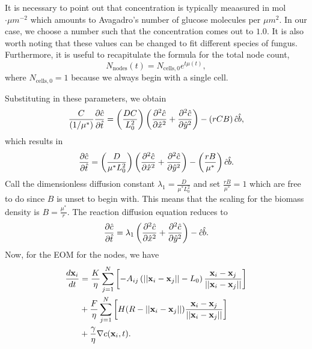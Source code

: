 It is necessary to point out that concentration is typically meaasured in
mol$\cdot \mu m^{-2}$ which amounts to Avagadro's number of glucose molecules
per $\mu m^{2}$. In our case, we choose a number such that the concentration
comes out to $1.0$. It is also worth noting that these values
can be changed to fit different species of fungus.
\\

Furthermore, it is useful to recapitulate the formula for the total node count,
\begin{equation*}  
    N_{\textrm{nodes}}(t) = N_{\textrm{cells},0} e^{ t \mu(t)},
\end{equation*}
where $N_{\textrm{cells},0} = 1$ because we always begin with a single cell.

Substituting in these parameters, we obtain 
\begin{equation*}
    \frac{C}{(1/\mu^*)}\pdv{\hat{c}}{\hat{t}} = \left(\frac{D C}{ L_0^2} \right)\left(\pdv[2]{\hat{c}}{\hat{x}} + \pdv[2]{\hat{c}}{\hat{y}} \right) -
      \left( r C B\right)  \hat{c}\hat{b},
\end{equation*}
which results in 
\begin{equation*}
    \pdv{\hat{c}}{\hat{t}} = \left(\frac{D}{ \mu^* L_0^2} \right)\left(\pdv[2]{\hat{c}}{\hat{x}} + \pdv[2]{\hat{c}}{\hat{y}} \right) -
      \left( \frac{r  B}{\mu^*}\right)  \hat{c}\hat{b}.
\end{equation*}
Call the dimensionless diffusion constant $\lambda_1 = \frac{D}{ \mu^* L_0^2}$ and 
set $\frac{r  B}{\mu^*}=1$ which are free to do since $B$ is unset to begin with. This means 
that the scaling for the biomass density is $B = \frac{\mu^*}{r}$. The reaction diffusion equation 
reduces to 
\begin{equation*}
    \pdv{\hat{c}}{\hat{t}} = \lambda_1 \left(\pdv[2]{\hat{c}}{\hat{x}} + \pdv[2]{\hat{c}}{\hat{y}} \right) -
      \hat{c}\hat{b}.
\end{equation*}
Now, for the EOM for the nodes, we have
\begin{equation*}
    \begin{split}
        \frac{d \vb{x}_i}{dt} &= 
        \frac{K}{ \eta}\sum_{j = 1}^N   \left[ - A_{ij} \left( ||\vb{x}_i - \vb{x}_j|| - L_0\right) \frac{\vb{x}_i - \vb{x}_j}{||\vb{x}_i - \vb{x}_j||} \right]\\
         &+ \frac{F}{ \eta}\sum_{j = 1}^N \left[ H(R - ||\vb{x}_i - \vb{x}_j||) \frac{\vb{x}_i - \vb{x}_j}{||\vb{x}_i - \vb{x}_j||}     \right]\\ 
         &+ \frac{\gamma}{\eta} \nabla c (\vb{x}_i, t).
    \end{split}
\end{equation*}
